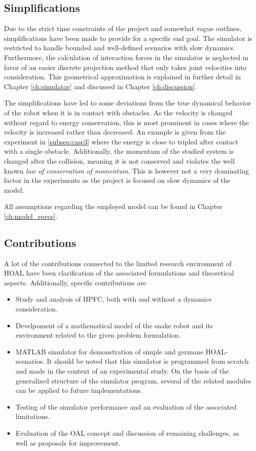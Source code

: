 \subsection{Simplifications}
Due to the strict time constraints of the project and somewhat vague outlines, simplifications have been made to provide for a specific end goal. The simulator is restricted to handle bounded and well-defined scenarios with slow dynamics. Furthermore, the calculation of interaction forces in the simulator is neglected in favor of an easier discrete projection method that only takes joint velocities into consideration. This geometrical approximation is explained in further detail in Chapter \ref{ch:simulator} and discussed in Chapter \ref{ch:discussion}.

The simplifications have led to some deviations from the true dynamical behavior of the robot when it is in contact with obstacles. As the velocity is changed without regard to energy conservation, this is most prominent in cases where the velocity is increased rather than decreased. An example is given from the experiment in \ref{subseq:case3} where the energy is close to tripled after contact with a single obstacle. Additionally, the momentum of the studied system is changed after the collision, meaning it is not conserved and violates the well known \textit{law of conservation of momentum}. This is however not a very dominating factor in the experiments as the project is focused on slow dynamics of the model.

All assumptions regarding the employed model can be found in Chapter \ref{ch:model_specs}.

\subsection{Contributions}
A lot of the contributions connected to the limited research environment of HOAL have been clarification of the associated formulations and theoretical aspects.
Additionally, specific contributions are 

\begin{itemize}
    \item Study and analysis of HPFC, both with and without a dynamics consideration.
    \item Develpoment of a mathematical model of the snake robot and its environment           related to the given problem formulation.
    \item MATLAB simulator for demonstration of simple and germane HOAL-scenarios.
        It should be noted that this simulator is programmed from scratch and made in the context of an experimental study.
        On the basis of the generalized structure of the simulator program, several of the related modules can be applied to future implementations.
    \item Testing of the simulator performance and an evaluation of the associated             limitations.
    \item Evaluation of the OAL concept and discussion of remaining challenges, as well     as proposals for improvement.
\end{itemize}

